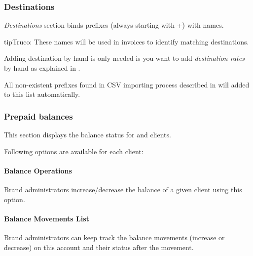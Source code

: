 \documentclass[letterpaper,10pt,spanish]{sphinxmanual}
\begin{document}
\subsubsection{Destinations}
\label{administration_portal/brand/billing/destinations::doc}\label{administration_portal/brand/billing/destinations:destinations}
\emph{Destinations} section binds prefixes (always starting with +) with names.

\begin{notice}{tip}{Truco:}
These names will be used in invoices to identify matching destinations.
\end{notice}

Adding destination by hand is only needed is you want to add \emph{destination rates} by hand as explained in {\hyperref[administration_portal/brand/billing/destination_rates:add\string-rates\string-manually]{}}.

All non-existent prefixes found in CSV importing process described in {\hyperref[administration_portal/brand/billing/destination_rates:importing\string-a\string-csv\string-file]{}} will added to this list
automatically.


\subsubsection{Prepaid balances}
\label{administration_portal/brand/billing/prepaid_balances::doc}\label{administration_portal/brand/billing/prepaid_balances:prepaid-balances}
This section displays the balance status for {\hyperref[administration_portal/brand/billing/index:prepaid\string-billing]{}} and {\hyperref[administration_portal/brand/billing/index:pseudo\string-prepaid\string-billing]{}} clients.

Following options are available for each client:


\paragraph{Balance Operations}
\label{administration_portal/brand/billing/prepaid_balances:balance-operations}
Brand administrators increase/decrease the balance of a given client using this option.


\paragraph{Balance Movements List}
\label{administration_portal/brand/billing/prepaid_balances:balance-movements-list}
Brand administrators can keep track the balance movements (increase or decrease) on this account and their status
after the movement.
\end{document}
